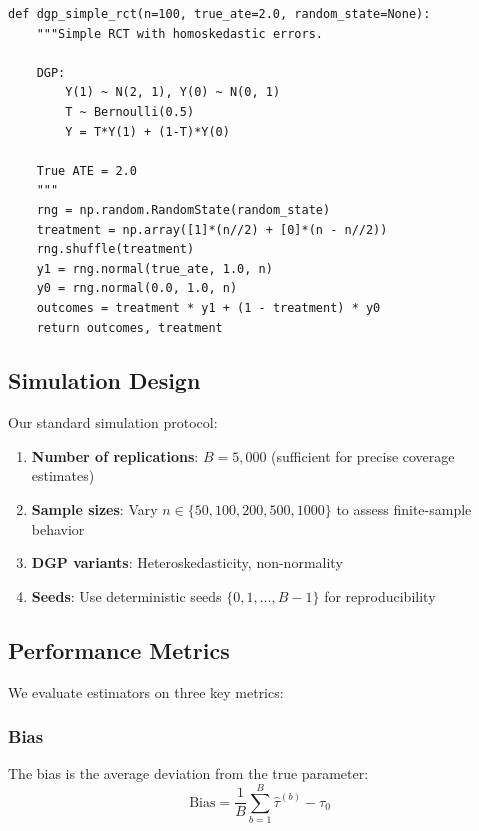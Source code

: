 \begin{verbatim}
def dgp_simple_rct(n=100, true_ate=2.0, random_state=None):
    """Simple RCT with homoskedastic errors.

    DGP:
        Y(1) ~ N(2, 1), Y(0) ~ N(0, 1)
        T ~ Bernoulli(0.5)
        Y = T*Y(1) + (1-T)*Y(0)

    True ATE = 2.0
    """
    rng = np.random.RandomState(random_state)
    treatment = np.array([1]*(n//2) + [0]*(n - n//2))
    rng.shuffle(treatment)
    y1 = rng.normal(true_ate, 1.0, n)
    y0 = rng.normal(0.0, 1.0, n)
    outcomes = treatment * y1 + (1 - treatment) * y0
    return outcomes, treatment
\end{verbatim}

\subsection{Simulation Design}

Our standard simulation protocol:

\begin{enumerate}
    \item \textbf{Number of replications}: $B = 5{,}000$ (sufficient for precise coverage estimates)
    \item \textbf{Sample sizes}: Vary $n \in \{50, 100, 200, 500, 1000\}$ to assess finite-sample behavior
    \item \textbf{DGP variants}: Heteroskedasticity, non-normality
    \item \textbf{Seeds}: Use deterministic seeds $\{0, 1, \ldots, B-1\}$ for reproducibility
\end{enumerate}

\subsection{Performance Metrics}

We evaluate estimators on three key metrics:

\subsubsection{Bias}

\begin{definition}[Bias]
\label{def:bias_metric}
The bias is the average deviation from the true parameter:
\begin{equation}
\text{Bias} = \frac{1}{B} \sum_{b=1}^{B} \hat{\tau}^{(b)} - \tau_0
\label{eq:bias}
\end{equation}
\end{definition}

